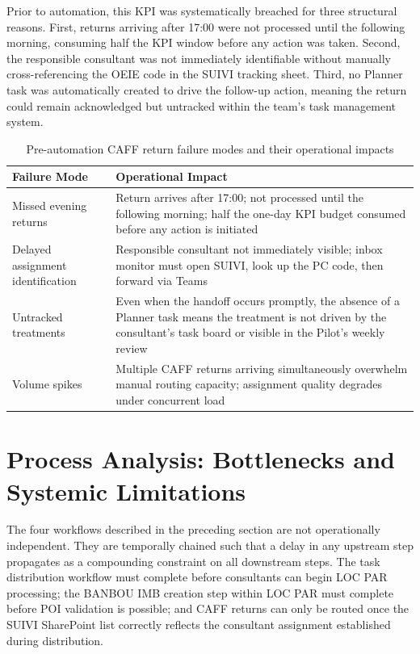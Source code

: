 Prior to automation, this KPI was systematically breached for three structural reasons. First, returns arriving after 17:00 were not processed until the following morning, consuming half the KPI window before any action was taken. Second, the responsible consultant was not immediately identifiable without manually cross-referencing the OEIE code in the SUIVI tracking sheet. Third, no Planner task was automatically created to drive the follow-up action, meaning the return could remain acknowledged but untracked within the team's task management system.

\begin{table}[H]
  \centering
  \caption{Pre-automation CAFF return failure modes and their operational impacts}
  \renewcommand{\arraystretch}{1.0}
  \begin{tabularx}{\textwidth}{|X|X|}
    \hline
    \textbf{Failure Mode} & \textbf{Operational Impact} \\ \hline
    Missed evening returns & Return arrives after 17:00; not processed until the following morning; half the one-day KPI budget consumed before any action is initiated \\ \hline
    Delayed assignment identification & Responsible consultant not immediately visible; inbox monitor must open SUIVI, look up the PC code, then forward via Teams \\ \hline
    Untracked treatments & Even when the handoff occurs promptly, the absence of a Planner task means the treatment is not driven by the consultant's task board or visible in the Pilot's weekly review \\ \hline
    Volume spikes & Multiple CAFF returns arriving simultaneously overwhelm manual routing capacity; assignment quality degrades under concurrent load \\ \hline
  \end{tabularx}
\end{table}

\section{Process Analysis: Bottlenecks and Systemic Limitations}

The four workflows described in the preceding section are not operationally independent. They are temporally chained such that a delay in any upstream step propagates as a compounding constraint on all downstream steps. The task distribution workflow must complete before consultants can begin LOC PAR processing; the BANBOU IMB creation step within LOC PAR must complete before POI validation is possible; and CAFF returns can only be routed once the SUIVI SharePoint list correctly reflects the consultant assignment established during distribution.

